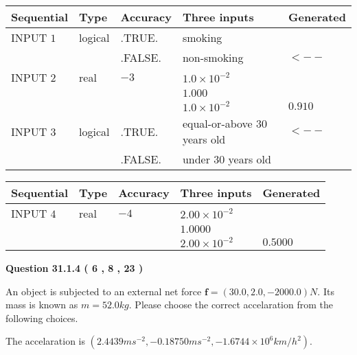 \documentclass[12pt]{article}
\begin{document}
   
  
  
\noindent\begin{tabular}{|l|l|l|l|l|}
\hline
 Sequential & Type & Accuracy & Three inputs & Generated \\ 
\hline
 
 
  INPUT $            1 $ & logical & .TRUE. & 
 smoking & 
  \\
  & & .FALSE. & 
  non-smoking & 
  $ <-- $ 
 \\  \hline  
 
 
  INPUT $            2 $ & real & $           -3  $ & $
 1.0 \times 10^{-2}
  $ & \\
  & & &  $
 1.000
  $ & \\
  & & &  $
 1.0 \times 10^{-2}
 $ & $ 0.910 $ 
 \\  \hline  
 
 
  INPUT $            3 $ & logical & .TRUE. & 
 equal-or-above 30 years old & 
  $ <-- $ 
  \\
  & & .FALSE. & 
  under 30 years old & 
 \\  \hline  
 \end{tabular}
   
   
  
  
\noindent\begin{tabular}{|l|l|l|l|l|}
\hline
 Sequential & Type & Accuracy & Three inputs & Generated \\ 
\hline
 
 
  INPUT $            4 $ & real & $           -4  $ & $
 2.00 \times 10^{-2}
  $ & \\
  & & &  $
 1.0000
  $ & \\
  & & &  $
 2.00 \times 10^{-2}
 $ & $ 0.5000 $ 
 \\  \hline  
 \end{tabular}
   
   
  
\vspace{0.2in}
  
{\textbf{\Large{Question
31.1.4 
 (           6 ,           8 ,          23 )
}}}
  
  
 
An object is subjected to an external net force $\mathbf{f}=(
30.0 ,
2.0,
-2000.0  )N$. Its mass is known as
$m= %
52.0  kg$. Please choose the correct accelaration
from the following choices.
 
 
 
The accelaration is
$(
2.4439ms^{-2},
-0.18750ms^{-2},
-1.6744 \times 10^{6}km/h^2
).
$
 
\end{document}
